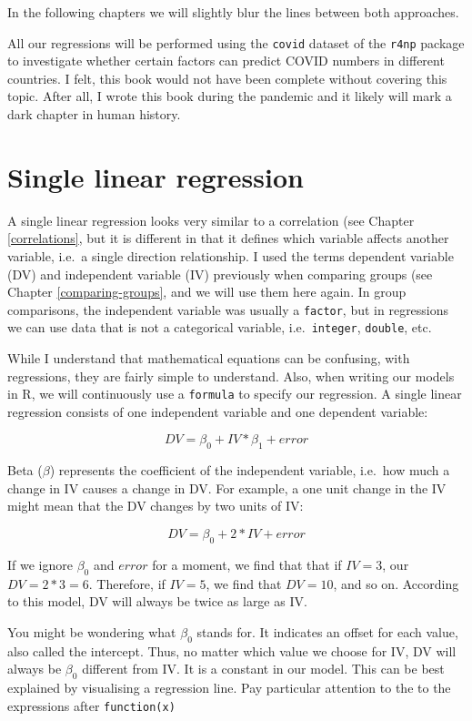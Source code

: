 \documentclass[
]{book}
\begin{document}
In the following chapters we will slightly blur the lines between both approaches.

All our regressions will be performed using the \texttt{covid} dataset of the \texttt{r4np} package to investigate whether certain factors can predict COVID numbers in different countries. I felt, this book would not have been complete without covering this topic. After all, I wrote this book during the pandemic and it likely will mark a dark chapter in human history.

\hypertarget{single-linear-regression}{%
\section{Single linear regression}\label{single-linear-regression}}

A single linear regression looks very similar to a correlation (see Chapter \ref{correlations}, but it is different in that it defines which variable affects another variable, i.e.~a single direction relationship. I used the terms dependent variable (DV) and independent variable (IV) previously when comparing groups (see Chapter \ref{comparing-groups}, and we will use them here again. In group comparisons, the independent variable was usually a \texttt{factor}, but in regressions we can use data that is not a categorical variable, i.e.~\texttt{integer}, \texttt{double}, etc.

While I understand that mathematical equations can be confusing, with regressions, they are fairly simple to understand. Also, when writing our models in R, we will continuously use a \texttt{formula} to specify our regression. A single linear regression consists of one independent variable and one dependent variable:

\[
DV = \beta_{0} + IV * \beta_{1} + error
\]

Beta (\(\beta\)) represents the coefficient of the independent variable, i.e.~how much a change in IV causes a change in DV. For example, a one unit change in the IV might mean that the DV changes by two units of IV:

\leavevmode\hypertarget{single-linear-regression-example}{}%
\[
DV = \beta_0 + 2 * IV + error
\]

If we ignore \(\beta_0\) and \(error\) for a moment, we find that that if \(IV = 3\), our \(DV = 2*3 = 6\). Therefore, if \(IV = 5\), we find that \(DV = 10\), and so on. According to this model, DV will always be twice as large as IV.

You might be wondering what \(\beta_0\) stands for. It indicates an offset for each value, also called the intercept. Thus, no matter which value we choose for IV, DV will always be \(\beta_0\) different from IV. It is a constant in our model. This can be best explained by visualising a regression line. Pay particular attention to the to the expressions after \texttt{function(x)}
\end{document}
